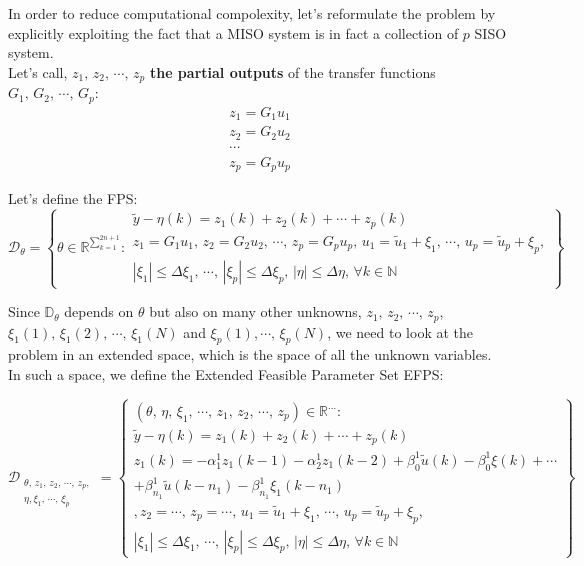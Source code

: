 In order to reduce computational compolexity, let's reformulate the problem by explicitly exploiting the fact that a MISO system is in fact a collection of $p$ SISO system. \\

Let's call, $z_1,\,z_2,\,\cdots,\,z_p$ \textbf{the partial outputs} of the transfer functions $G_1,\,G_2,\,\cdots,\,G_p$:
\[
\begin{array}{c}
z_1 = G_1u_1\\
z_2 = G_2u_2\\
\cdots\\
z_p = G_pu_p
\end{array}
\]

Let's define the FPS: 
\[
\mathcal{D}_\theta = \left\{ \theta \in \mathbb{R}^{\sum_{k=1}^{2n+1}} : 
\begin{array}{l}
\tilde{y} - \eta(k) = z_1(k) + z_2(k) + \cdots + z_p(k) \\
z_1 = G_1u_1,\,
z_2 = G_2u_2,\,
\cdots,\,
z_p = G_pu_p,\,
u_1 = \tilde{u}_1 + \xi_1, \, \cdots, \, u_p = \tilde{u}_p + \xi_p, \\
|\xi_1| \leq \Delta \xi_1, \, \cdots, \, |\xi_p| \leq \Delta \xi_p, \, |\eta| \leq \Delta \eta, \, \forall k \in \mathbb{N}
\end{array}
\right\}
\]

Since $\mathbb{D}_\theta$ depends on $\theta$ but also on many other unknowns, $z_1,\,z_2,\,\cdots,\,z_p$, $\xi_1(1),\,\xi_1(2),\,\cdots,\,\xi_1(N)$ and $\xi_p(1),\cdots,\,\xi_p(N)$, we need to look at the problem in an extended space, which is the space of all the unknown variables.\\
In such a space, we define the Extended Feasible Parameter Set EFPS:


\[
\mathcal{D}_{\begin{array}{l}
\theta,\,z_1,\,z_2,\,\cdots,\,z_p,\,\\\eta,\xi_1,\,\cdots,\,\xi_p
\end{array}
} = \left\{ 
\begin{array}{l}
(\theta,\,\eta,\,\xi_1,\,\cdots,\,z_1,\,z_2,\,\cdots,\,z_p) \in \mathbb{R}^{...} :\\
\tilde{y} - \eta(k) = z_1(k) + z_2(k) + \cdots + z_p(k) \\
z_1(k) = -\alpha_1^1z_1(k-1)-\alpha_2^1z_1(k-2) + \beta_0^1\tilde{u}(k) - \beta_0^1\xi(k) + \cdots \\
+ \beta_{n_1}^1\tilde{u}(k-n_1) - \beta_{n_1}^1\xi_1(k-n_1)\\,
z_2 = \cdots,\,
z_p = \cdots,\,
u_1 = \tilde{u}_1 + \xi_1, \, \cdots, \, u_p = \tilde{u}_p + \xi_p, \\
|\xi_1| \leq \Delta \xi_1, \, \cdots, \, |\xi_p| \leq \Delta \xi_p, \, |\eta| \leq \Delta \eta, \, \forall k \in \mathbb{N}
\end{array}
\right\}
\]

